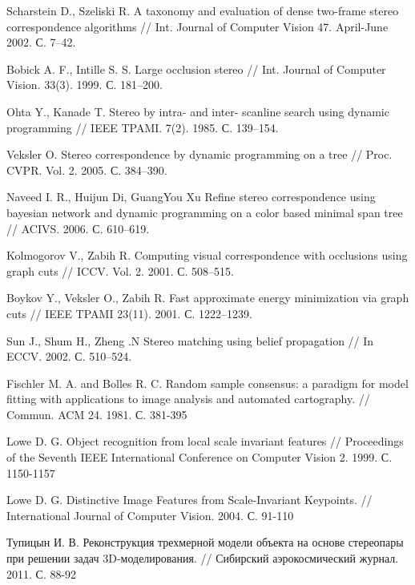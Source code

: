 
\begin{thebibliography}{1}
	Scharstein D., Szeliski R. A taxonomy and evaluation of dense
	two-frame stereo correspondence algorithms // Int. Journal of
	Computer Vision 47. April-June 2002. С. 7–42.
	
	Bobick A. F., Intille S. S. Large occlusion stereo // Int. Journal
	of Computer Vision. 33(3). 1999. С. 181–200.
	
	Ohta Y., Kanade T. Stereo by intra- and inter- scanline search
	using dynamic programming // IEEE TPAMI. 7(2). 1985.
	С. 139–154.
	
	Veksler O. Stereo correspondence by dynamic programming on a
	tree // Proc. CVPR. Vol. 2. 2005. С. 384–390.
	
	Naveed I. R., Huijun Di, GuangYou Xu Refine stereo
	correspondence using bayesian network and dynamic programming
	on a color based minimal span tree // ACIVS. 2006. С. 610–619.
	
	Kolmogorov V., Zabih R. Computing visual correspondence with
	occlusions using graph cuts // ICCV. Vol. 2. 2001. С. 508–515.
	
	Boykov Y., Veksler O., Zabih R. Fast approximate energy
	minimization via graph cuts // IEEE TPAMI 23(11). 2001.
	С. 1222–1239.
	
	Sun J., Shum H., Zheng .N Stereo matching using belief
	propagation // In ECCV. 2002. С. 510–524.
	
	
	Fischler M. A. and Bolles R. C. Random sample consensus: a paradigm for model fitting with applications to image analysis and automated cartography. // Commun. ACM 24. 1981. С. 381-395
	
	Lowe D. G. Object recognition from local scale invariant features // Proceedings of the Seventh IEEE International Conference on Computer Vision 2. 1999. С. 1150-1157
	
	Lowe D. G. Distinctive Image Features from Scale-Invariant Keypoints. // International Journal of Computer Vision. 2004. С. 91-110
	
	Тупицын И. В. Реконструкция трехмерной модели объекта на основе стереопары при решении задач 3D-моделирования. // Сибирский аэрокосмический журнал. 2011. С. 88-92
\end{thebibliography}
